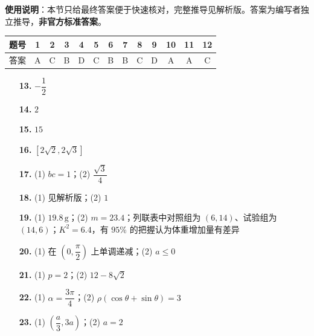 
\begin{gknotice}
\textbf{使用说明}：本节只给最终答案便于快速核对，完整推导见解析版。答案为编写者独立推导，\textbf{非官方标准答案}。
\end{gknotice}

\begin{center}\begin{tabular}{ccccccccccccc}
\toprule
题号 & 1 & 2 & 3 & 4 & 5 & 6 & 7 & 8 & 9 & 10 & 11 & 12 \\
\midrule
答案 & A & C & B & D & C & B & B & C & D & A & A & C \\
\bottomrule
\end{tabular}\end{center}

\begin{itemize}[leftmargin=2.6em]
  \item[\textbf{13.}] $-\dfrac12$
  \item[\textbf{14.}] $2$
  \item[\textbf{15.}] $15$
  \item[\textbf{16.}] $[2\sqrt2,2\sqrt3]$
\end{itemize}

\begin{itemize}[leftmargin=2.6em]
  \item[\textbf{17.}] (1) $bc=1$；(2) $\dfrac{\sqrt3}{4}$
  \item[\textbf{18.}] (1) 见解析版；(2) $1$
  \item[\textbf{19.}] (1) $19.8\,\mathrm g$；(2) $m=23.4$；列联表中对照组为 $(6,14)$、试验组为 $(14,6)$；$K^2=6.4$，有 $95\%$ 的把握认为体重增加量有差异
  \item[\textbf{20.}] (1) 在 $\left(0,\dfrac\pi2\right)$ 上单调递减；(2) $a\leqslant0$
  \item[\textbf{21.}] (1) $p=2$；(2) $12-8\sqrt2$
\end{itemize}

\begin{itemize}[leftmargin=2.6em]
  \item[\textbf{22.}] (1) $\alpha=\dfrac{3\pi}{4}$；(2) $\rho(\cos\theta+\sin\theta)=3$
  \item[\textbf{23.}] (1) $\left(\dfrac a3,3a\right)$；(2) $a=2$
\end{itemize}
